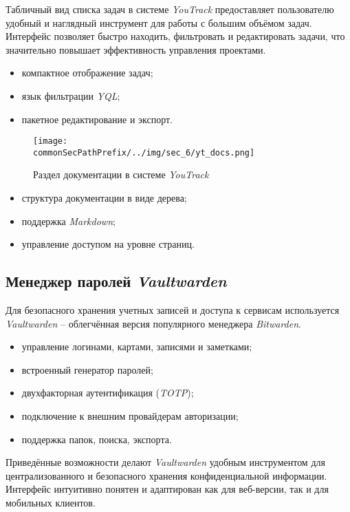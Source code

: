 Табличный вид списка задач в системе \textit{YouTrack} предоставляет пользователю удобный и наглядный инструмент для работы с большим объёмом задач. Интерфейс позволяет быстро находить, фильтровать и редактировать задачи, что значительно повышает эффективность управления проектами.

\begin{itemize}
    \item компактное отображение задач;
    \item язык фильтрации \textit{YQL};
    \item пакетное редактирование и экспорт.
\end{itemize}

\begin{figure}[ht]
    \centering
    \texttt{[image: \\commonSecPathPrefix/../img/sec\_6/yt\_docs.png]}
    \caption{Раздел документации в системе \textit{YouTrack}}
    \label{fig:user_guide:yt_docs}
\end{figure}

\begin{itemize}
    \item структура документации в виде дерева;
    \item поддержка \textit{Markdown};
    \item управление доступом на уровне страниц.
\end{itemize}

\subsection{Менеджер паролей \textit{Vaultwarden}}

Для безопасного хранения учетных записей и доступа к сервисам используется \textit{Vaultwarden}\cite{vaultwarden} -- облегчённая версия популярного менеджера \textit{Bitwarden}.

\begin{itemize}
    \item управление логинами, картами, записями и заметками;
    \item встроенный генератор паролей;
    \item двухфакторная аутентификация (\textit{TOTP});
    \item подключение к внешним провайдерам авторизации;
    \item поддержка папок, поиска, экспорта.
\end{itemize}

Приведённые возможности делают \textit{Vaultwarden} удобным инструментом для централизованного и безопасного хранения конфиденциальной информации. Интерфейс интуитивно понятен и адаптирован как для веб-версии, так и для мобильных клиентов.

